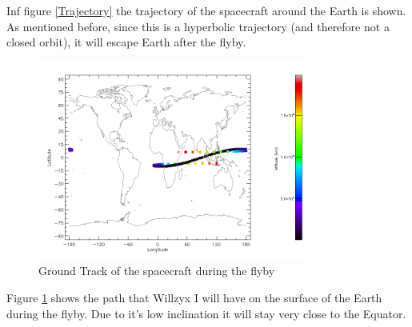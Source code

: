 Inf figure \ref{Trajectory} the trajectory of the spacecraft around the Earth is shown. As mentioned before, since this is a hyperbolic trajectory (and therefore not a closed orbit), it will escape Earth after the flyby.

\begin{figure}[H]
\centering
\includegraphics[width=0.78\textwidth]{figures/GroundTrack.png}
\caption{Ground Track of the spacecraft during the flyby}
\label{GroundTrack}
\end{figure}

Figure \ref{GroundTrack} shows the path that Willzyx I will have on the surface of the Earth during the flyby. Due to it's low inclination it will stay very close to the Equator.
